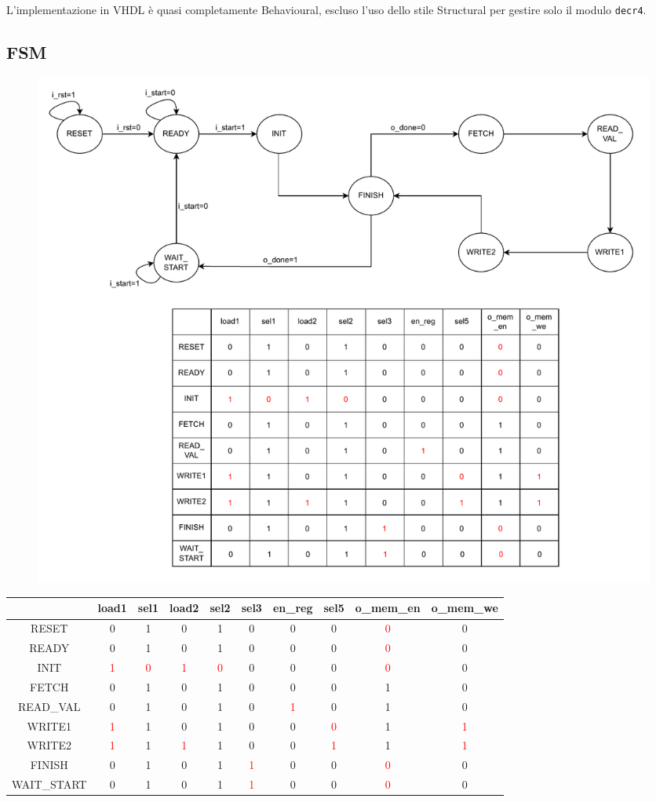 \documentclass{article}
\begin{document}
 L’implementazione in VHDL è quasi completamente Behavioural, escluso l’uso dello stile Structural per gestire solo il modulo \texttt{decr4}.

\subsection{FSM}

\begin{figure}[H]
  \centering
  \includegraphics[width=1\textwidth, trim=0cm 11cm 0cm 0cm, clip]{modulofsm.pdf}
  \label{fig:FSM}
\end{figure}

\begin{table}[htbp]
\centering
\begin{tabular}{|c|*{9}{c|}}
\hline
& load1 & sel1 & load2 & sel2 & sel3 & en\_reg& sel5 & o\_mem\_en & o\_mem\_we \\
\hline
RESET & 0 & 1 & 0 & 1 & 0 & 0 & 0 & \textcolor{red}{0} & 0 \\
\hline
READY & 0 & 1 & 0 & 1 & 0 & 0 & 0 & \textcolor{red}{0} & 0 \\
\hline
INIT & \textcolor{red}{1} & \textcolor{red}{0} & \textcolor{red}{1} & \textcolor{red}{0} & 0 & 0 & 0 & \textcolor{red}{0} & 0 \\
\hline
FETCH & 0 & 1 & 0 & 1 & 0 & 0 & 0 & 1 & 0 \\
\hline
READ\_VAL & 0 & 1 & 0 & 1 & 0 & \textcolor{red}{1} & 0 & 1 & 0 \\
\hline
WRITE1 & \textcolor{red}{1} & 1 & 0 & 1 & 0 & 0 & \textcolor{red}{0} & 1 & \textcolor{red}{1} \\
\hline
WRITE2 & \textcolor{red}{1} & 1 & \textcolor{red}{1} & 1 & 0 & 0 & \textcolor{red}{1} & 1 & \textcolor{red}{1} \\
\hline
FINISH & 0 & 1 & 0 & 1 & \textcolor{red}{1} & 0 & 0 & \textcolor{red}{0} & 0 \\
\hline
WAIT\_START & 0 & 1 & 0 & 1 & \textcolor{red}{1} & 0 & 0 & \textcolor{red}{0} & 0 \\
\hline
\end{tabular}
\label{tab:Uscite della FSM}
\end{table}
\end{document}
